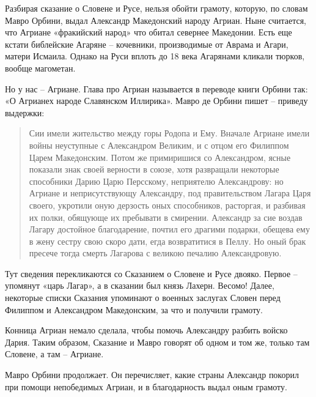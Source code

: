 Разбирая сказание о Словене и Русе, нельзя обойти грамоту, которую, по словам Мавро Орбини, выдал Александр Македонский народу Агриан. Ныне считается, что Агриане «фракийский народ» что обитал севернее Македонии. Есть еще кстати библейские Агаряне – кочевники, производимые от Аврама и Агари, матери Исмаила. Однако на Руси вплоть до 18 века Агарянами кликали тюрков, вообще магометан. 

Но у нас – Агриане. Глава про Агриан называется в переводе книги Орбини так: «О Агрианех народе Славянском Иллирика». Мавро де Орбини пишет – приведу выдержки:

\begin{quotation}
Сии имели жительство между горы Родопа и Ему. Вначале Агриане имели войны неуступные с Александром Великим, и с отцом его Филиппом Царем Македонским. Потом же примиришися со Александром, ясные показали знак своей верности в союзе, хотя развращали некоторые способники Дарию Царю Персскому, неприятелю Александрову: но Агриане и неприсутствующу Александру, под правительством Лагара Царя своего, укротили оную дерзость оных способников, расторгая, и разбивая их полки, обящующе их пребывати в смирении. Александр за сие воздав Лагару достойное благодарение, почтил его драгими подарки, обещева ему в жену сестру свою скоро дати, егда возвратитися в Пеллу. Но оный брак пресече тогда смерть Лагарова с великою печалию Александровую.
\end{quotation}

Тут сведения перекликаются со Сказанием о Словене и Русе двояко. Первое – упомянут «царь Лагар», а в сказании был князь Лахерн. Весомо! Далее, некоторые списки Сказания упоминают о военных заслугах Словен перед Филиппом и Александром Македонским, за что и получили грамоту.

Конница Агриан немало сделала, чтобы помочь Александру разбить войско Дария. Таким образом, Сказание и Мавро говорят об одном и том же, только там Словене, а там – Агриане.

Мавро Орбини продолжает. Он перечисляет, какие страны Александр покорил при помощи непобедимых Агриан, и в благодарность выдал оным грамоту.

